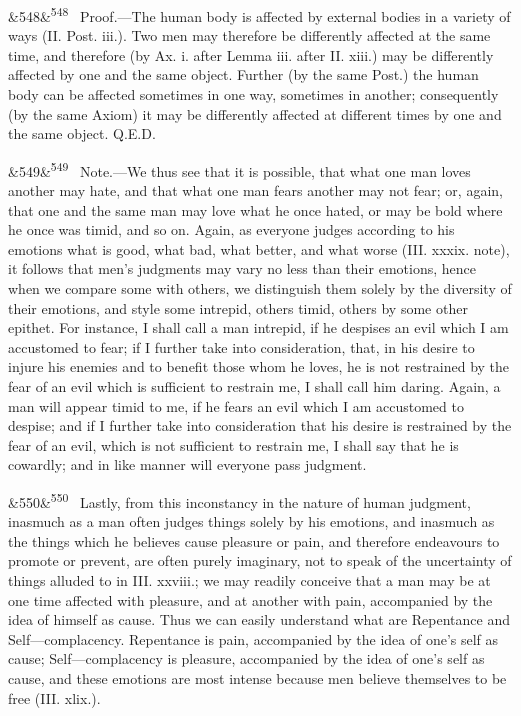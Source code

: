 \documentclass[12pt]{article}
\newcommand{\para}[1][]{\par\noindent\ifx&#1&\else\textsuperscript{\footnotesize #1}~\fi}
\begin{document}
\para[548] Proof.---The human body is affected by external bodies in a variety of ways (II. Post. iii.). Two men may therefore be differently affected at the same time, and therefore (by Ax. i. after Lemma iii. after II. xiii.) may be differently affected by one and the same object. Further (by the same Post.) the human body can be affected sometimes in one way, sometimes in another; consequently (by the same Axiom) it may be differently affected at different times by one and the same object. Q.E.D.

\para[549] Note.---We thus see that it is possible, that what one man loves another may hate, and that what one man fears another may not fear; or, again, that one and the same man may love what he once hated, or may be bold where he once was timid, and so on. Again, as everyone judges according to his emotions what is good, what bad, what better, and what worse (III. xxxix. note), it follows that men's judgments may vary no less than their emotions, hence when we compare some with others, we distinguish them solely by the diversity of their emotions, and style some intrepid, others timid, others by some other epithet. For instance, I shall call a man intrepid, if he despises an evil which I am accustomed to fear; if I further take into consideration, that, in his desire to injure his enemies and to benefit those whom he loves, he is not restrained by the fear of an evil which is sufficient to restrain me, I shall call him daring. Again, a man will appear timid to me, if he fears an evil which I am accustomed to despise; and if I further take into consideration that his desire is restrained by the fear of an evil, which is not sufficient to restrain me, I shall say that he is cowardly; and in like manner will everyone pass judgment.

\para[550] Lastly, from this inconstancy in the nature of human judgment, inasmuch as a man often judges things solely by his emotions, and inasmuch as the things which he believes cause pleasure or pain, and therefore endeavours to promote or prevent, are often purely imaginary, not to speak of the uncertainty of things alluded to in III. xxviii.; we may readily conceive that a man may be at one time affected with pleasure, and at another with pain, accompanied by the idea of himself as cause. Thus we can easily understand what are Repentance and Self---complacency. Repentance is pain, accompanied by the idea of one's self as cause; Self---complacency is pleasure, accompanied by the idea of one's self as cause, and these emotions are most intense because men believe themselves to be free (III. xlix.).
\end{document}
